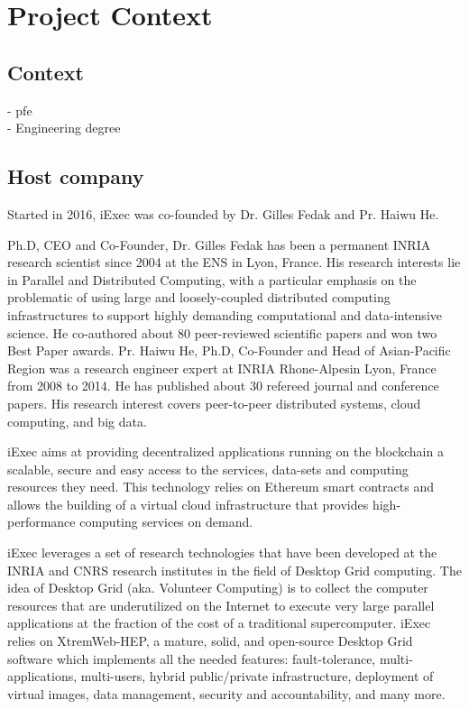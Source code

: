 
\chapter{Project Context}

\ifpdf
    \graphicspath{{2.0-Context/Figs/Raster/}{2.0-Context/Figs/PDF/}{2.0-Context/Figs/}}
\else
    \graphicspath{{2.0-Context/Figs/Vector/}{2.0-Context/Figs/}}
\fi

\section{Context}
- pfe \\
- Engineering degree

\section{Host company}
Started in 2016, iExec was co-founded by Dr. Gilles Fedak and Pr. Haiwu He.

Ph.D, CEO and Co-Founder, Dr. Gilles Fedak has been a permanent INRIA research scientist since 2004
at the ENS in Lyon, France. His research interests lie in Parallel and Distributed Computing,
with a particular emphasis on the problematic of using large and loosely-coupled distributed
computing infrastructures to support highly demanding computational and data-intensive science.
He co-authored about 80 peer-reviewed scientific papers and won two Best Paper awards.
Pr. Haiwu He, Ph.D, Co-Founder and Head of Asian-Pacific Region was a research engineer expert at
INRIA Rhone-Alpesin Lyon, France from 2008 to 2014. He has published about 30 refereed journal and
conference papers. His research interest covers peer-to-peer distributed systems, cloud computing,
and big data.

iExec aims at providing decentralized applications running on the blockchain a scalable, secure
and easy access to the services, data-sets and computing resources they need. This technology
relies on Ethereum smart contracts and allows the building of a virtual cloud infrastructure that
provides high-performance computing services on demand.

iExec leverages a set of research technologies that have been developed at the INRIA and CNRS
research institutes in the field of Desktop Grid computing. The idea of Desktop Grid (aka. Volunteer
Computing) is to collect the computer resources that are underutilized on the Internet to execute
very large parallel applications at the fraction of the cost of a traditional supercomputer.
iExec relies on XtremWeb-HEP, a mature, solid, and open-source Desktop Grid software which implements
all the needed features: fault-tolerance, multi-applications, multi-users, hybrid public/private
infrastructure, deployment of virtual images, data management, security and accountability,
and many more.

